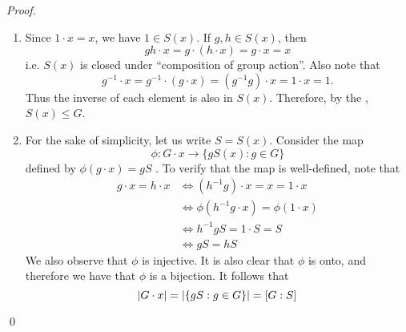 \begin{proof}
  \begin{enumerate}
    \item Since $1 \cdot x = x$, we have $1 \in S(x)$. If $g, h \in S(x)$, then
      \begin{equation*}
        gh \cdot x = g \cdot (h \cdot x) = g \cdot x = x
      \end{equation*}
      i.e. $S(x)$ is closed under ``composition of group action''. Also note that
      \begin{equation*}
        g^{-1} \cdot x = g^{-1} \cdot (g \cdot x) = (g^{-1}g) \cdot x = 1 \cdot x = 1.
      \end{equation*}
      Thus the inverse of each element is also in $S(x)$. Therefore, by the , $S(x) \leq G$.

    \item For the sake of simplicity, let us write $S = S(x)$. Consider the map
      \begin{equation*}
        \phi: G \cdot x \to \{g S(x) : g \in G\}
      \end{equation*}
      defined by $\phi(g \cdot x) = gS$ . To verify that the map is well-defined, note that
      \begin{align*}
        g \cdot x = h \cdot x &\iff (h^{-1} g) \cdot x = x = 1 \cdot x \\
                              &\iff \phi(h^{-1} g \cdot x) = \phi( 1 \cdot x ) \\
                              &\iff h^{-1}g S = 1 \cdot S = S \\
                              &\iff gS = hS
      \end{align*}
      We also observe that $\phi$ is injective. It is also clear that $\phi$ is onto, and therefore we have that $\phi$ is a bijection. It follows that
      \begin{equation*}
        \left|G \cdot x\right| = \left| \{gS : g \in G \} \right| = [G : S]
      \end{equation*}
  \end{enumerate}\qed
\end{proof}

